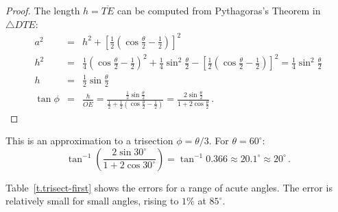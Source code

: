 \begin{proof}
\newpage

The length $h=\overline{TE}$ can be computed from Pythagoras's Theorem in $\triangle DTE$:
\begin{eqnarray*}
a^2 &=& h^2 + \left[\frac{1}{2}\left(\cos \frac{\theta}{2}-\frac{1}{2}\right)\right]^2\\
h^2&=&\frac{1}{4}\left(\cos \frac{\theta}{2}-\frac{1}{2}\right)^2+\frac{1}{4}\sin^2\frac{\theta}{2}-\left[\frac{1}{2}\left(\cos \frac{\theta}{2}-\frac{1}{2}\right)\right]^2=
\frac{1}{4}\sin^2\frac{\theta}{2}\\
h&=&\frac{1}{2}\sin\frac{\theta}{2}\\
\tan\phi &=&\frac{h}{\overline{OE}}=\displaystyle\frac{\displaystyle\frac{1}{2}\sin\frac{\theta}{2}}{\displaystyle\frac{1}{2}+\frac{1}{2}\left(\cos \frac{\theta}{2}\! -\! \frac{1}{2}\right)}
=\frac{\displaystyle2\sin\frac{\theta}{2}}{\displaystyle 1+2\cos\frac{\theta}{2}}\,.
\end{eqnarray*}                  
\end{proof}

This is an approximation to a trisection $\phi=\theta/3$. For $\theta=60^\circ$:
\[
\tan^{-1}\left(\frac{2\sin 30^\circ}{1+2\cos 30^\circ}\right)=
\tan^{-1}0.366\approx 20.1^\circ\approx 20^\circ\,.
\]

\newpage

Table~\ref{t.trisect-first} shows the errors for a range of acute angles. The error is relatively small for small angles, rising to $1\%$ at $85^\circ$.


